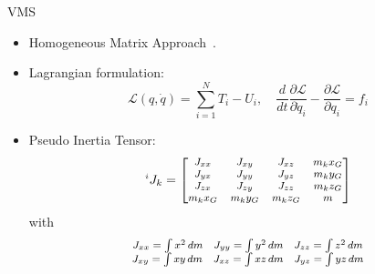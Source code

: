\begin{frame}{VMS}
\begin{itemize}
    \item Homogeneous Matrix Approach~\cite{hma1,hma2}.
    \item Lagrangian formulation: 
    \begin{equation} 
        \mathcal{L} (q,\dot{q}) = \sum_{i=1}^NT_i-U_i, \quad  \frac{d}{dt}\frac{\partial \mathcal{L} }{\partial \dot{q}_i}-\frac{\partial \mathcal{L} }{\partial q_i}=f_i 
    \end{equation}
    \item Pseudo Inertia Tensor: 
    \begin{equation}
        \begin{footnotesize}
        \prescript{i}{}{J_k}=\begin{bmatrix}
            J_{xx}&J_{xy}&J_{xz}&m_kx_G\\
            J_{yx}&J_{yy}&J_{yz}&m_ky_G\\
            J_{zx}&J_{zy}&J_{zz}&m_kz_G\\
            m_kx_G&m_ky_G&m_kz_G&m
        \end{bmatrix}                 
        \end{footnotesize}
    \end{equation}
    with \begin{equation}
        \begin{footnotesize}
        \begin{array}{c}
            J_{xx}=\int x^2\,dm\quad J_{yy}=\int y^2\,dm\quad J_{zz}=\int z^2\,dm\\
            J_{xy}=\int xy\,dm\quad J_{xz}=\int xz\,dm\quad J_{yz}=\int yz\,dm
        \end{array}
        \end{footnotesize}
        \end{equation}
\end{itemize}
\end{frame}


